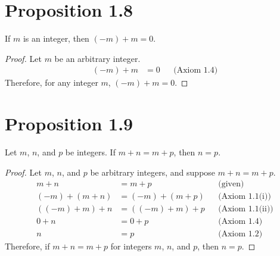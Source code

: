 \section*{Proposition 1.8}
If $m$ is an integer, then $(-m)+m = 0$.
\begin{proof}
    Let $m$ be an arbitrary integer.
    \begin{align*}
        (-m) + m & = 0 &  & \text{(Axiom 1.4)}
    \end{align*}
    Therefore, for any integer $m$, $(-m) + m = 0$.
\end{proof}

\section*{Proposition 1.9}
Let $m$, $n$, and $p$ be integers. If $m+n = m+ p$, then $n = p$.
\begin{proof}
    Let $m$, $n$, and $p$ be arbitrary integers, and suppose $m + n = m + p$.
    \begin{align*}
        m + n          & = m + p          &  & \text{(given)}         \\
        (-m) + (m + n) & = (-m) + (m + p) &  & \text{(Axiom 1.1(i))}  \\
        ((-m) + m) + n & = ((-m) + m) + p &  & \text{(Axiom 1.1(ii))} \\
        0 + n          & = 0 + p          &  & \text{(Axiom 1.4)}     \\
        n              & = p              &  & \text{(Axiom 1.2)}
    \end{align*}
    Therefore, if $m + n = m + p$ for integers $m$, $n$, and $p$, then $n = p$.
\end{proof}

